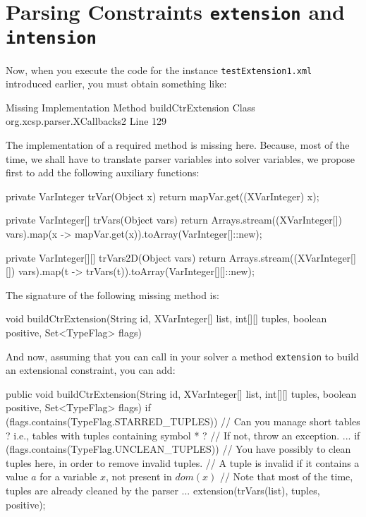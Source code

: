 \documentclass[10pt]{article}
\newenvironment{boxabsc}
               {\medskip \begin{bclogo}[barre=none,arrondi=0.2,logo=]{}\vspace{-0.6cm}}
               {\vspace{-0.1cm}\end{bclogo} \smallskip}
\newcommand{\gb}[1]{{\tt #1}} %
\newcommand{\nn}[1]{{\tt #1}} %
\begin{document}
\section{Parsing Constraints \gb{extension} and \gb{intension}}


Now, when you execute the code for the instance \nn{testExtension1.xml} introduced earlier, you must obtain something like:

\begin{boxabsc}
\begin{void}
Missing Implementation
  Method buildCtrExtension
  Class org.xcsp.parser.XCallbacks2
  Line 129
\end{void} 
\end{boxabsc}
 
The implementation of a required method is missing here. Because, most of the time, we shall have to translate parser variables into solver variables, we propose first to add the following auxiliary functions:

\begin{boxabsc}
\begin{absc}
private VarInteger trVar(Object x) {
  return mapVar.get((XVarInteger) x);
}

private VarInteger[] trVars(Object vars) {
  return Arrays.stream((XVarInteger[]) vars).map(x -> mapVar.get(x)).toArray(VarInteger[]::new);
}

private VarInteger[][] trVars2D(Object vars) {
  return Arrays.stream((XVarInteger[][]) vars).map(t -> trVars(t)).toArray(VarInteger[][]::new);
}
\end{absc} 
\end{boxabsc}

The signature of the following missing method is:

\begin{boxabsc}
\begin{absc}
void buildCtrExtension(String id, XVarInteger[] list, int[][] tuples, boolean positive, Set<TypeFlag> flags)
\end{absc} 
\end{boxabsc}

And now, assuming that you can call in your solver a method \nn{extension} to build an extensional constraint, you can add:
	
\begin{boxabsc}
\begin{absc}
public void buildCtrExtension(String id, XVarInteger[] list, int[][] tuples, boolean positive, Set<TypeFlag> flags) {
  if (flags.contains(TypeFlag.STARRED_TUPLES)) {
    // Can you manage short tables ? i.e., tables with tuples containing symbol * ? 
    // If not, throw an exception.
    ...
  }
  if (flags.contains(TypeFlag.UNCLEAN_TUPLES)) {
    // You have possibly to clean tuples here, in order to remove invalid tuples. 
    // A tuple is invalid if it contains a value $a$ for a variable $x$, not present in $dom(x)$
    // Note that most of the time, tuples are already cleaned by the parser
    ...
  }
  extension(trVars(list), tuples, positive);
}
\end{absc} 
\end{boxabsc}
\end{document}

